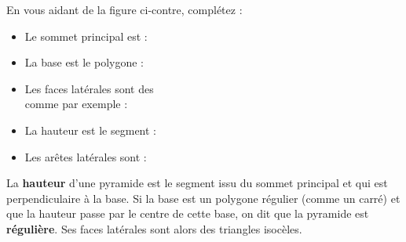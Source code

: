 \documentclass[a4paper]{book}
\begin{document}
    \noindent
    \begin{minipage}{0.55\textwidth}
    \begin{exemple}
        En vous aidant de la figure ci-contre, complétez :
        \begin{itemize}
            \item Le sommet principal est : \points[6]
            \item La base est le polygone : \points[6]
            \item Les faces latérales sont des \points[5] \\
            comme par exemple : \points[8]
            \item La hauteur est le segment : \points[6]
            \item Les arêtes latérales sont : \points[8]
        \end{itemize}
    \end{exemple}
    \end{minipage}
    \hfill
    \begin{minipage}{0.4\textwidth}
    \centering
    \end{minipage}
    
    \begin{remarque}
        La \textbf{hauteur} d'une pyramide est le segment issu du sommet principal et qui est perpendiculaire à la base. Si la base est un polygone régulier (comme un carré) et que la hauteur passe par le centre de cette base, on dit que la pyramide est \textbf{régulière}. Ses faces latérales sont alors des triangles \points[8] isocèles.
    \end{remarque}
    
\end{document}
